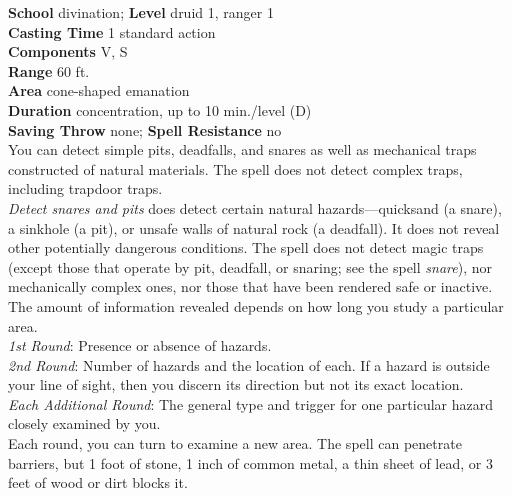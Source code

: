 \textbf{School} divination; \textbf{Level} druid 1, ranger 1\\
\textbf{Casting Time} 1 standard action\\
\textbf{Components} V, S\\
\textbf{Range} 60 ft.\\
\textbf{Area} cone-shaped emanation\\
\textbf{Duration} concentration, up to 10 min./level (D)\\
\textbf{Saving Throw} none; \textbf{Spell Resistance} no\\
You can detect simple pits, deadfalls, and snares as well as mechanical traps constructed of natural materials. The spell does not detect complex traps, including trapdoor traps.\\
\textit{Detect snares and pits }does detect certain natural hazards---quicksand (a snare), a sinkhole (a pit), or unsafe walls of natural rock (a deadfall). It does not reveal other potentially dangerous conditions. The spell does not detect magic traps (except those that operate by pit, deadfall, or snaring; see the spell \textit{snare}), nor mechanically complex ones, nor those that have been rendered safe or inactive.\\
The amount of information revealed depends on how long you study a particular area.\\
\textit{1st Round}: Presence or absence of hazards.\\
\textit{2nd Round}: Number of hazards and the location of each. If a hazard is outside your line of sight, then you discern its direction but not its exact location.\\
\textit{Each Additional Round}: The general type and trigger for one particular hazard closely examined by you.\\
Each round, you can turn to examine a new area. The spell can penetrate barriers, but 1 foot of stone, 1 inch of common metal, a thin sheet of lead, or 3 feet of wood or dirt blocks it.\\
